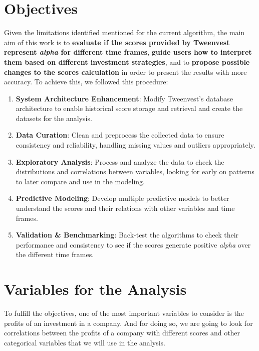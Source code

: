 \documentclass[11pt,english,a4paper,hidelinks]{book}
\begin{document}
\section{Objectives}

\noindent Given the limitations identified mentioned for the current algorithm, the main aim of this work is to \textbf{evaluate if the scores provided by Tweenvest represent \textit{alpha} for different time frames}, \textbf{guide users how to interpret them based on different investment strategies}, and to \textbf{propose possible changes to the scores calculation} in order to present the results with more accuracy. To achieve this, we followed this procedure:

\begin{enumerate}
  \item \textbf{System Architecture Enhancement}: Modify Tweenvest's database architecture to enable historical score storage and retrieval and create the datasets for the analysis.
  \item \textbf{Data Curation}: Clean and preprocess the collected data to ensure consistency and reliability, handling missing values and outliers appropriately.
  \item \textbf{Exploratory Analysis}: Process and analyze the data to check the distributions and correlations between variables, looking for early on patterns to later compare and use in the modeling.
  \item \textbf{Predictive Modeling}: Develop multiple predictive models to better understand the scores and their relations with other variables and time frames.
  \item \textbf{Validation \& Benchmarking}: Back-test the algorithms to check their performance and consistency to see if the scores generate positive \textit{alpha} over the different time frames.
\end{enumerate}

\section{Variables for the Analysis}

To fulfill the objectives, one of the most important variables to consider is the profits of an investment in a company. And for doing so, we are going to look for correlations between the profits of a company with different scores and other categorical variables that we will use in the analysis.
\end{document}
